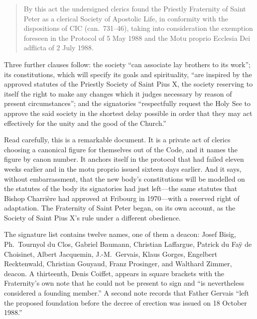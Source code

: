 \begin{quote}\small
By this act the undersigned clerics found the Priestly Fraternity of
Saint Peter as a clerical Society of Apostolic Life, in conformity with
the dispositions of CIC (can.\ 731--46), taking into consideration the
exemption foreseen in the Protocol of 5 May 1988 and the Motu proprio
Ecclesia Dei adflicta of 2 July 1988.
\end{quote}

Three further clauses follow: the society ``can associate lay brothers to
its work''; its constitutions, which will specify its goals and
spirituality, ``are inspired by the approved statutes of the Priestly
Society of Saint Pius X, the society reserving to itself the right to
make any changes which it judges necessary by reason of present
circumstances''; and the signatories ``respectfully request the Holy See
to approve the said society in the shortest delay possible in order that
they may act effectively for the unity and the good of the Church.''

Read carefully, this is a remarkable document. It is a private act of
clerics choosing a canonical figure for themselves out of the Code, and
it names the figure by canon number. It anchors itself in the protocol
that had failed eleven weeks earlier and in the motu proprio issued
sixteen days earlier. And it says, without embarrassment, that the new
body's constitutions will be modelled on the statutes of the body its
signatories had just left---the same statutes that Bishop Charrière had
approved at Fribourg in 1970---with a reserved right of adaptation. The
Fraternity of Saint Peter began, on its own account, as the Society of
Saint Pius X's rule under a different obedience.

The signature list contains twelve names, one of them a deacon: Josef
Bisig, Ph.\ Tournyol du Clos, Gabriel Baumann, Christian Laffargue,
Patrick du Faÿ de Choisinet, Albert Jacquemin, J.-M.\ Gervais, Klaus
Gorges, Engelbert Recktenwald, Christian Gouyaud, Franz Prosinger, and
Walthard Zimmer, deacon. A thirteenth, Denis Coiffet, appears in square
brackets with the Fraternity's own note that he could not be present to
sign and ``is nevertheless considered a founding member.'' A second note
records that Father Gervais ``left the proposed foundation before the
decree of erection was issued on 18 October 1988.''

